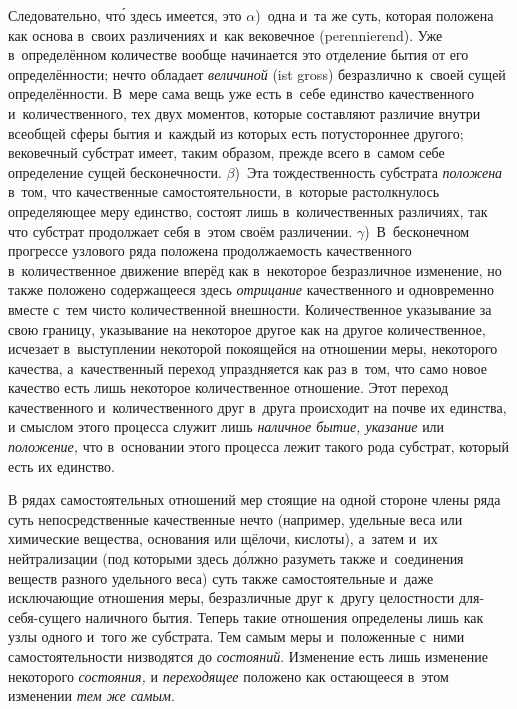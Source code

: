 Следовательно, чт\'{о} здесь имеется, это $\alpha$)~одна и~та же суть,
которая положена как основа в~своих различениях и~как вековечное
(peren\-nie\-rend). Уже в~определённом количестве вообще начинается это
отделение бытия от его определённости; нечто обладает {\em величиной} (ist
gross) безразлично к~своей сущей определённости. В~мере сама вещь уже есть
в~себе единство качественного и~количественного, тех двух моментов, которые
составляют различие внутри всеобщей сферы бытия и~каждый из которых есть
потустороннее другого; вековечный субстрат имеет, таким образом, прежде всего
в~самом себе определение сущей бесконечности. $\beta$)~Эта тождественность
субстрата {\em положена} в~том, что качественные самостоятельности, в~которые
растолкнулось определяющее меру единство, состоят лишь в~количественных
различиях, так что субстрат продолжает себя в~этом своём различении.
$\gamma$)~В~бесконечном прогрессе узлового ряда положена продолжаемость
качественного в~количественное движение вперёд как в~некоторое безразличное
изменение, но также положено содержащееся здесь {\em отрицание} качественного и
одновременно вместе с~тем чисто количественной внешности. Количественное
указывание за свою границу, указывание на некоторое другое как на другое
количественное, исчезает в~выступлении некоторой покоящейся на отношении меры,
некоторого качества, а~качественный переход упраздняется как раз в~том, что
само новое качество есть лишь некоторое количественное отношение. Этот переход
качественного и~количественного друг в~друга происходит на почве их единства, и
смыслом этого процесса служит лишь {\em наличное бытие, указание} или
{\em положение,} что в~основании этого процесса лежит такого рода субстрат,
который есть их единство.

В рядах самостоятельных отношений мер стоящие на одной стороне члены ряда суть
непосредственные качественные нечто (например, удельные веса или химические
вещества, основания или щёлочи, кислоты), а~затем и~их нейтрализации (под
которыми здесь д\'{о}лжно разуметь также и~соединения веществ разного удельного
веса) суть также самостоятельные и~даже исключающие отношения меры,
безразличные друг к~другу целостности для-себя-сущего наличного бытия. Теперь
такие отношения определены лишь как узлы одного и~того же субстрата. Тем самым
меры и~положенные с~ними самостоятельности низводятся до {\em состояний}.
Изменение есть лишь изменение некоторого {\em состояния,} и {\em переходящее}
положено как остающееся в~этом изменении {\em тем же самым}.


